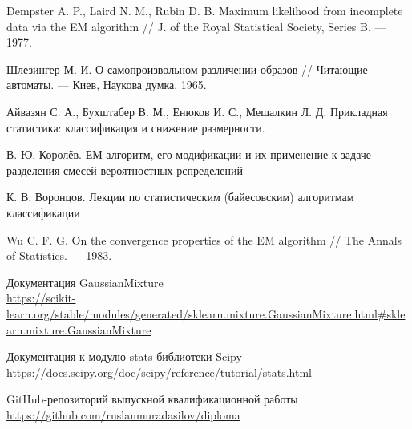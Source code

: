 \begin{thebibliography}{99}

 Dempster A. P., Laird N. M., Rubin D. B. Maximum likelihood from incomplete data via the EM algorithm // J. of the Royal Statistical Society, Series B. — 1977.

 Шлезингер М. И. О самопроизвольном различении образов // Читающие автоматы. — Киев, Наукова думка, 1965.

 Айвазян С. А., Бухштабер В. М., Енюков И. С., Мешалкин Л. Д. Прикладная статистика: классификация и снижение размерности.

 В. Ю. Королёв. ЕМ-алгоритм, его модификации и их применение к задаче разделения смесей вероятностных рспределений

 К. В. Воронцов. Лекции по статистическим (байесовским) алгоритмам классификации

 Wu C. F. G. On the convergence properties of the EM algorithm // The Annals of Statistics. — 1983.

 Документация GaussianMixture \\ \url{https://scikit-learn.org/stable/modules/generated/sklearn.mixture.GaussianMixture.html#sklearn.mixture.GaussianMixture}

 Документация к модулю stats библиотеки Scipy \\ \url{https://docs.scipy.org/doc/scipy/reference/tutorial/stats.html}

 GitHub-репозиторий выпускной квалификационной работы \\ \url{https://github.com/ruslanmuradasilov/diploma}

\end{thebibliography}